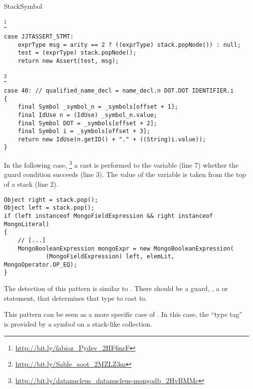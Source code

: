 \begin{pattern}{StackSymbol}

\instances{}

\footnote{\url{http://bit.ly/fabioz_Pydev_2HF6nrF}}

\begin{verbatim}
case JJTASSERT_STMT:
    exprType msg = arity == 2 ? ((exprType) stack.popNode()) : null;
    test = (exprType) stack.popNode();
    return new Assert(test, msg);
\end{verbatim}

\footnote{\url{http://bit.ly/Sable_soot_2MZLZ3m}}

\begin{verbatim}
case 40: // qualified_name_decl = name_decl.n DOT.DOT IDENTIFIER.i
{
    final Symbol _symbol_n = _symbols[offset + 1];
    final IdUse n = (IdUse) _symbol_n.value;
    final Symbol DOT = _symbols[offset + 2];
    final Symbol i = _symbols[offset + 3];
    return new IdUse(n.getID() + "." + ((String)i.value));
}
\end{verbatim}

In the following case,%
\footnote{\url{http://bit.ly/datanucleus_datanucleus-mongodb_2HvBMMc}}
a cast is performed to the  variable (line 7)
whether the guard condition succeeds (line 3).
The value of the  variable is taken from the top of a stack (line 2).

\begin{verbatim}
Object right = stack.pop();
Object left = stack.pop();
if (left instanceof MongoFieldExpression && right instanceof MongoLiteral)
{
    // [...]
    MongoBooleanExpression mongoExpr = new MongoBooleanExpression(
            (MongoFieldExpression) left, elemLit, MongoOperator.OP_EQ);
}
\end{verbatim}


\detection{}
The detection of this pattern is similar to .
There should be a guard, \eg, a  or  statement,
that determines that type to cast to.

\discussion{}

\related{}
This pattern can be seen as a more specific case of .
In this case, the ``type tag'' is provided by a symbol on a stack-like collection.

\end{pattern}
